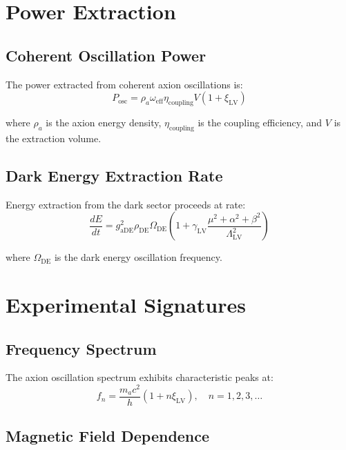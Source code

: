 \documentclass[11pt]{article}
\begin{document}
\section{Power Extraction}

\subsection{Coherent Oscillation Power}

The power extracted from coherent axion oscillations is:
\begin{equation}
P_{\text{osc}} = \rho_a \omega_{\text{eff}} \eta_{\text{coupling}} V \left(1 + \xi_{\text{LV}}\right)
\end{equation}

where $\rho_a$ is the axion energy density, $\eta_{\text{coupling}}$ is the coupling efficiency, and $V$ is the extraction volume.

\subsection{Dark Energy Extraction Rate}

Energy extraction from the dark sector proceeds at rate:
\begin{equation}
\frac{dE}{dt} = g_{\text{aDE}}^2 \rho_{\text{DE}} \Omega_{\text{DE}} \left(1 + \gamma_{\text{LV}} \frac{\mu^2 + \alpha^2 + \beta^2}{\Lambda_{\text{LV}}^2}\right)
\end{equation}

where $\Omega_{\text{DE}}$ is the dark energy oscillation frequency.

\section{Experimental Signatures}

\subsection{Frequency Spectrum}

The axion oscillation spectrum exhibits characteristic peaks at:
\begin{equation}
f_n = \frac{m_a c^2}{h} \left(1 + n \xi_{\text{LV}}\right), \quad n = 1, 2, 3, \ldots
\end{equation}

\subsection{Magnetic Field Dependence}
\end{document}
